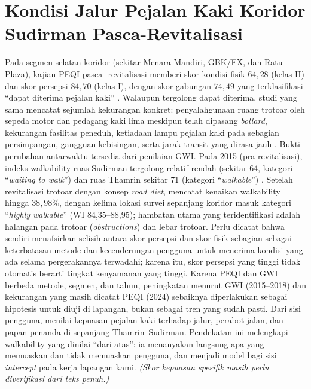 \documentclass[11pt,a4paper]{report}
\begin{document}
\section{Kondisi Jalur Pejalan Kaki Koridor Sudirman Pasca-Revitalisasi}
Pada segmen selatan koridor (sekitar Menara Mandiri, GBK/FX, dan Ratu Plaza), kajian PEQI pasca-
revitalisasi memberi skor kondisi fisik \(64{,}28\) (kelas II) dan skor persepsi \(84{,}70\)
(kelas I), dengan skor gabungan \(74{,}49\) yang terklasifikasi ``dapat diterima pejalan kaki''
\autocite{dwisadana2024}. %
Walaupun tergolong dapat diterima, studi yang sama mencatat sejumlah kekurangan konkret:
penyalahgunaan ruang trotoar oleh sepeda motor dan pedagang kaki lima meskipun telah dipasang
\textit{bollard}, kekurangan fasilitas peneduh, ketiadaan lampu pejalan kaki pada sebagian
persimpangan, gangguan kebisingan, serta jarak transit yang dirasa jauh \autocite{dwisadana2024}.
Bukti perubahan antarwaktu tersedia dari penilaian GWI. Pada 2015 (pra-revitalisasi), indeks
walkability ruas Sudirman tergolong relatif rendah (sekitar 64, kategori ``\textit{waiting to
walk}'') dan ruas Thamrin sekitar 71 (kategori ``\textit{walkable}'')
\autocite{ridhani2015,mulyadi2022}. %
Setelah revitalisasi trotoar dengan konsep \textit{road diet}, \textcite{mulyadi2022} mencatat
kenaikan walkability hingga \(38{,}98\%\), dengan kelima lokasi survei sepanjang koridor masuk
kategori ``\textit{highly walkable}'' (WI 84,35--88,95); hambatan utama yang teridentifikasi
adalah halangan pada trotoar (\textit{obstructions}) dan lebar trotoar. %
Perlu dicatat bahwa \textcite{dwisadana2024} sendiri menafsirkan selisih antara skor persepsi dan
skor fisik sebagian sebagai keterbatasan metode dan kecenderungan pengguna untuk menerima kondisi
yang ada selama pergerakannya terwadahi; karena itu, skor persepsi yang tinggi tidak otomatis
berarti tingkat kenyamanan yang tinggi. Karena PEQI \autocite{dwisadana2024} dan GWI
\autocite{mulyadi2022} berbeda metode, segmen, dan tahun, peningkatan menurut GWI (2015--2018)
dan kekurangan yang masih dicatat PEQI (2024) sebaiknya diperlakukan sebagai hipotesis untuk
diuji di lapangan, bukan sebagai tren yang sudah pasti.
Dari sisi pengguna, \textcite{apritasari2020satisfaction} menilai kepuasan pejalan kaki terhadap
jalur, perabot jalan, dan papan penanda di sepanjang Thamrin--Sudirman. Pendekatan ini melengkapi
walkability yang dinilai ``dari atas'': ia menanyakan langsung apa yang memuaskan dan tidak
memuaskan pengguna, dan menjadi model bagi sisi \textit{intercept} pada kerja lapangan kami.
\emph{(Skor kepuasan spesifik masih perlu diverifikasi dari teks penuh.)}
\end{document}
